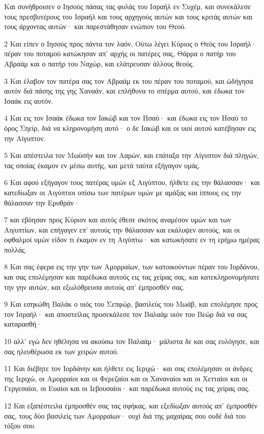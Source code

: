 \par Και συνήθροισεν ο Ιησούς πάσας τας φυλάς του Ισραήλ εν Συχέμ, και συνεκάλεσε τους πρεσβυτέρους του Ισραήλ και τους αρχηγούς αυτών και τους κριτάς αυτών και τους άρχοντας αυτών· και παρεστάθησαν ενώπιον του Θεού.
\par 2 Και είπεν ο Ιησούς προς πάντα τον λαόν, Ούτω λέγει Κύριος ο Θεός του Ισραήλ· πέραν του ποταμού κατώκησαν απ' αρχής οι πατέρες σας, Θάρρα ο πατήρ του Αβραάμ και ο πατήρ του Ναχώρ, και ελάτρευσαν άλλους θεούς.
\par 3 Και έλαβον τον πατέρα σας τον Αβραάμ εκ του πέραν του ποταμού, και ώδήγησα αυτόν διά πάσης της γης Χαναάν, και επλήθυνα το σπέρμα αυτού, και έδωκα τον Ισαάκ εις αυτόν.
\par 4 Και εις τον Ισαάκ έδωκα τον Ιακώβ και τον Ησαύ· και έδωκα εις τον Ησαύ το όρος Σηείρ, διά να κληρονομήση αυτό· ο δε Ιακώβ και οι υιοί αυτού κατέβησαν εις την Αίγυπτον.
\par 5 Και απέστειλα τον Μωϋσήν και τον Ααρών, και επάταξα την Αίγυπτον διά πληγών, τας οποίας έκαμον εν μέσω αυτής, και μετά ταύτα εξήγαγον υμάς.
\par 6 Και αφού εξήγαγον τους πατέρας υμών εξ Αιγύπτου, ήλθετε εις την θάλασσαν· και κατεδίωξαν οι Αιγύπτιοι οπίσω των πατέρων υμών με αμάξας και ίππους εις την θάλασσαν την Ερυθράν·
\par 7 και εβόησαν προς Κύριον και αυτός έθεσε σκότος αναμέσον υμών και των Αιγυπτίων, και επήγαγεν επ' αυτούς την θάλασσαν και εκάλυψεν αυτούς, και οι οφθαλμοί υμών είδον τι έκαμον εν τη Αιγύπτω· και κατωκήσατε εν τη ερήμω ημέρας πολλάς.
\par 8 Και σας έφερα εις την γην των Αμορραίων, των κατοικούντων πέραν του Ιορδάνου, και σας επολέμησαν και παρέδωκα αυτούς εις τας χείρας σας, και κατεκληρονομήσατε την γην αυτών, και εξωλόθρευσα αυτούς απ' έμπροσθέν σας.
\par 9 Και εσηκώθη Βαλάκ ο υιός του Σεπφώρ, βασιλεύς του Μωάβ, και επολέμησε προς τον Ισραήλ· και αποστείλας προσεκάλεσε τον Βαλαάμ υιόν του Βεώρ διά να σας καταρασθή·
\par 10 αλλ' εγώ δεν ηθέλησα να ακούσω τον Βαλαάμ· μάλιστα δε και σας ευλόγησε, και σας ηλευθέρωσα εκ των χειρών αυτού.
\par 11 Και διέβητε τον Ιορδάνην και ήλθετε εις Ιεριχώ· και σας επολέμησαν οι άνδρες της Ιεριχώ, οι Αμορραίοι και οι Φερεζαίοι και οι Χαναναίοι και οι Χετταίοι και οι Γεργεσαίοι, οι Ευαίοι και οι Ιεβουσαίοι· και παρέδωκα αυτούς εις τας χείρας σας.
\par 12 Και εξαπέστειλα έμπροσθέν σας τας σφήκας, και εξεδίωξαν αυτούς απ' έμπροσθέν σας, τους δύο βασιλείς των Αμορραίων· ουχί διά της μαχαίρας σου ουδέ διά του τόξου σου.
